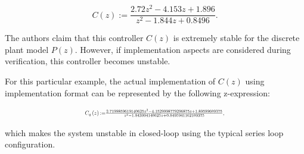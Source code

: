 \documentclass{sig-alternate-05-2015}
\begin{document}
\begin{equation}
\label{Eq:running-example-controller}
C\left(z\right) := \frac{2.72z^2 - 4.153z + 1.896}{z^2 - 1.844z + 0.8496}.
\end{equation}

The authors claim that this controller $C(z)$ is extremely stable for the discrete plant model $P(z)$. However, if implementation aspects are considered during verification, this controller becomes unstable. 

For this particular example, the actual implementation of $C(z)$ using  implementation format can be represented by the following z-expression:

\begin{equation}
\label{Eq:running-example-controller-quantized}
\resizebox{0.5\textwidth}{!}{
$C_{q}\left(z\right) {:=} \frac{2.7199859619140625z^2 - 4.1529998779296875z + 1.89599609375}{z^2 - 1.843994140625z + 0.8495941162109375},$
}
\end{equation} 

\noindent which makes the system unstable in closed-loop using the typical series loop configuration.


%

%

\end{document}
